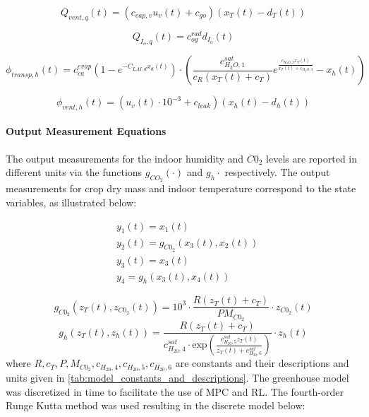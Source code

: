\begin{equation}
	Q_{vent,q}(t) = (c_{cap,v}u_v(t) + c_{go})(x_T(t) - d_T(t))
	\label{heat exchange}
\end{equation}

\begin{equation}
	Q_{I_o,q}(t) = c_{og}^{rad} d_{I_o}(t)
\end{equation}

\begin{equation}
	\phi_{transp,h}(t) = c_{ca}^{evap}(1 - e^{-C_{LAI,d} x_d(t)})\cdot \left( \frac{c_{H_2O,1}^{sat}}{c_R(x_T(t)+c_T)} e^{\frac{c_{H_2O,2}x_T(t)}{x_T(t) + c_{H_2O,3}}} - x_h(t) \right)
\end{equation}

\begin{equation}
	\phi_{vent,h}(t) = (u_v(t) \cdot 10^{-3} + c_{leak})(x_h(t) - d_h(t))
\end{equation}

\paragraph{Output Measurement Equations}
The output measurements for the indoor humidity and $C0_2$ levels are reported in different units via the functions $g_{CO_2}(\cdot)$ and $g_h{\cdot}$ respectively.  The output measurements for crop dry mass and indoor temperature correspond to the state variables, as illustrated below:

\begin{equation}
	\begin{aligned}
		& y_1(t) = x_1(t) 
		\\
		& y_{2}(t) = g_{C0_2}(x_3(t),x_{2}(t))
		\\
		& y_3 (t) = x_3(t)
		\\
		& y_{4} = g_h (x_3(t),x_4(t))
	\end{aligned}
\end{equation}

\begin{equation}\label{eq:output_equations_c02}
	g_{C0_2}(z_T(t),z_{C0_2}(t)) = 10^3 \cdot \frac{R(z_T(t) + c_T)}{PM_{C0_2}} \cdot z_{C0_2}(t)
\end{equation}
\begin{equation}\label{eq:output_equations_h}
	g_h (z_T(t),z_h(t)) = \frac{R(z_T(t) + c_T)}{c_{H_20,4}^{sat}\cdot \text{exp}(\frac{c_{H_20,5}^{sat}z_T(t)}{z_T(t) + c_{H_20,6}^{sat}})} \cdot z_{h}(t)
\end{equation}
where $R,c_T,P,M_{C0_2},c_{H_20,4},c_{H_20,5},c_{H_20,6}$ are constants and their descriptions and units given in \autoref{tab:model_constants_and_descriptions}. The greenhouse model was discretized in time to facilitate the use of MPC and RL. The fourth-order Runge Kutta method was used resulting in the discrete model below:

